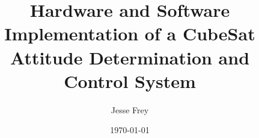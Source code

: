 \documentclass{uafthesis}
\author{Jesse Frey}
\title{Hardware and Software Implementation of a CubeSat Attitude Determination and Control System}
\date{\today}
\begin{document}
\newcommand{\ChapterRef}[1]{\hyperref[#1]{Chapter~\ref*{#1}}}

\listoftodos
\clearpage

\setcounter{page}{1}
\thispagestyle{empty}


\makesig

\begin{comment}
\addcontentsline{toc}{section}{\signame}
\begin{center}
    {\large \bfseries {\expandafter\uppercase\expandafter{Title}} \par}
    \bigskip \bigskip
    By \par
    \bigskip \bigskip
    {Jesse Frey} \par
    \bigskip \bigskip \medskip
\vspace{.25in}
\end{center}
RECOMMENDED: \hspace{.75in} \rule{3in}{.05mm}\vskip2.5ex\relax
\noindent\phantom{RECOMMENDED: \hspace{.75in} }\rule{3in}{.05mm}
\vskip2.5ex\relax
\noindent\phantom{RECOMMENDED: \hspace{.75in} }\rule{3in}{.05mm}
\vskip2.5ex\relax

\vskip-3.5ex\relax
\noindent\phantom{RECOMMENDED: \hspace{.75in} }\relax Advisory Committee Chair \vskip2.5ex

\noindent\phantom{RECOMMENDED: \hspace{.75in} }\rule{3in}{.05mm}
\vskip-1ex\relax
\noindent\phantom{RECOMMENDED: \hspace{.75in} }\relax Chair, Dep. Electrical and Computer Engineering

\bigskip \bigskip \bigskip \par

\noindent APPROVED: \hspace{.75in} \rule{3.75in}{.05mm}
\vskip-1ex\relax
\noindent\phantom{APPROVED: \hspace{.75in} }Dean, {College of Engineering and Mines}
\vskip2.5ex\relax
\noindent\phantom{APPROVED: \hspace{.75in} }\rule{3.75in}{.05mm}
\vskip-1ex\relax
\noindent\phantom{APPROVED: \hspace{.75in} }Dean of the Graduate
School
\vskip2.5ex\relax
\noindent\phantom{APPROVED: \hspace{.75in} }\rule{3.75in}{.05mm}
\vskip-1ex\relax
\noindent\phantom{APPROVED: \hspace{.75in} }Date

\newpage
\end{comment}
\end{document}
